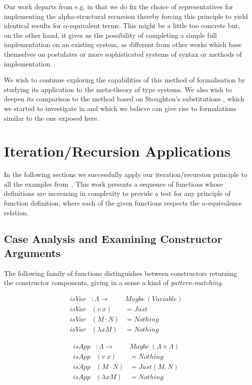 \documentclass{entcs}
\newcommand{\alp}{\ensuremath{\alpha}}
\begin{document}
Our work departs from e.g. \cite{Pitts2} in that we do fix the choice of representatives for implementing the alpha-structural recursion thereby forcing this principle to yield identical results for $\alpha$-equivalent terms. This might be a little too concrete  but, on the other hand, it gives us the possibility of completing a simple full implementation on an existing system, as different from other works which base themselves on postulates or more sophisticated systems of syntax or methods of implementation.

We wish to continue exploring the capabilities of this method of formalisation by studying its application to the meta-theory of type systems. We also wish to deepen its comparison to the method  based on Stoughton's substitutions \cite{stoughton}, which we started to investigate in \cite{nos} and which we believe can give rise to formulations similar to the one exposed here.

\appendix

\section{Iteration/Recursion Applications}
\label{sec:applications}

In the following sections we successfully apply our iteration/recursion principle to all the examples from~\cite{Norrish04recursivefunction}. This work presents a sequence of functions whose definitions are increasing in complexity to provide a test for any principle of function definition, where each of the given functions respects the \alp-equivalence relation.

\subsection{Case Analysis and Examining Constructor Arguments}
\label{sec:caseanalysis}

The following family of functions distinguishes between constructors returning the constructor components, giving in a sense a kind of \emph{pattern-matching}.

\begin{minipage}{.47\textwidth}
\[\begin{array}{rll}
isVar &: \Lambda \rightarrow& Maybe\ ( Variable ) \\
isVar &(v\ x)         &= Just \\
isVar &(M \cdot N)   &= Nothing \\
isVar &(\lambda x M) &= Nothing
\end{array}\]
\end{minipage}
\begin{minipage}{.47\textwidth}
\[\begin{array}{rll}
isApp &: \Lambda \rightarrow& Maybe\ (\Lambda \times \Lambda) \\
isApp &(v\ x)          &= Nothing \\
isApp &(M \cdot N)   &= Just (M , N) \\
isApp &(\lambda x M) &= Nothing
\end{array}\]
\end{minipage}
\end{document}
